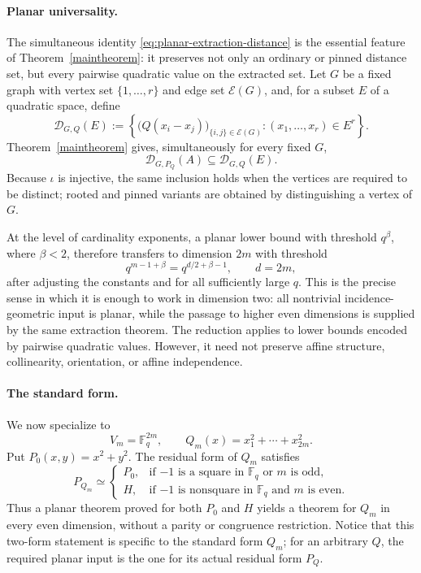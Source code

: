 \documentclass[11pt]{article}
\newcommand{\F}{\mathbb F}
\begin{document}
\paragraph{Planar universality.}
The simultaneous identity \eqref{eq:planar-extraction-distance} is the
essential feature of Theorem~\ref{maintheorem}: it preserves not only an
ordinary or pinned distance set, but every pairwise quadratic value on the
extracted set.  Let \(G\) be a fixed graph with vertex set
\(\{1,\ldots,r\}\) and edge set \(\mathcal E(G)\), and, for a subset \(E\)
of a quadratic space, define
\[
    \mathcal D_{G,Q}(E)
    :=
    \left\{
        \bigl(Q(x_i-x_j)\bigr)_{\{i,j\}\in\mathcal E(G)}
        :
        (x_1,\ldots,x_r)\in E^r
    \right\}.
\]
Theorem~\ref{maintheorem} gives, simultaneously for every fixed \(G\),
\[
    \mathcal D_{G,P_Q}(A)
    \subseteq
    \mathcal D_{G,Q}(E).
\]
Because \(\iota\) is injective, the same inclusion holds when the vertices
are required to be distinct; rooted and pinned variants are obtained by
distinguishing a vertex of \(G\).

At the level of cardinality exponents, a planar lower bound with threshold
\(q^\beta\), where \(\beta<2\), therefore transfers to dimension \(2m\)
with threshold
\[
    q^{m-1+\beta}
    =
    q^{d/2+\beta-1},
    \qquad d=2m,
\]
after adjusting the constants and for all sufficiently large \(q\).  This
is the precise sense in which it is enough to work in dimension two: all
nontrivial incidence-geometric input is planar, while the passage to higher
even dimensions is supplied by the same extraction theorem.  The reduction
applies to lower bounds encoded by pairwise quadratic values. However, it need not preserve affine structure, collinearity, orientation, or affine
independence.

\paragraph{The standard form.}
We now specialize to
\begin{equation}
\label{eq:fixed-form}
    V_m=\F_q^{2m},
    \qquad
    Q_m(x)=x_1^2+\cdots+x_{2m}^2.
\end{equation}
Put \(P_0(x,y)=x^2+y^2\).  The residual form of \(Q_m\) satisfies
\[
    P_{Q_m}
    \simeq
    \begin{cases}
        P_0,&\text{if \(-1\) is a square in \(\F_q\) or \(m\) is odd},\\
        H,&\text{if \(-1\) is nonsquare in \(\F_q\) and \(m\) is even}.
    \end{cases}
\]
Thus a planar theorem proved for both \(P_0\) and \(H\) yields a theorem
for \(Q_m\) in every even dimension, without a parity or congruence
restriction.  Notice that this two-form statement is specific to the
standard form \(Q_m\); for an arbitrary \(Q\), the required planar input is
the one for its actual residual form \(P_Q\).
\end{document}
